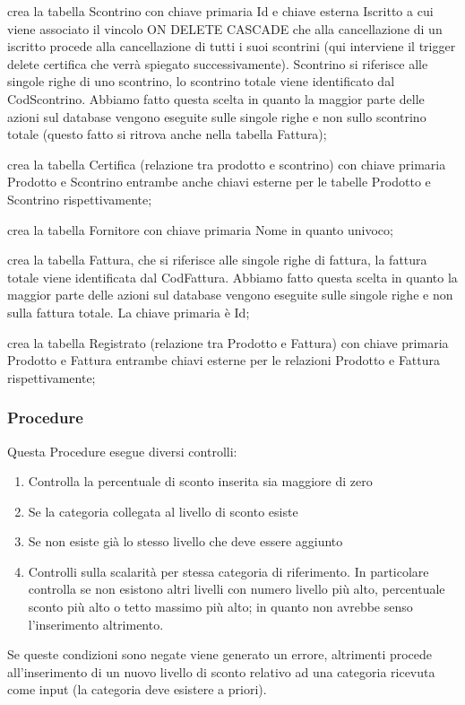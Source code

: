 
crea la tabella Scontrino con chiave primaria Id e chiave esterna Iscritto a cui viene associato il vincolo ON DELETE CASCADE che alla cancellazione di un iscritto procede alla cancellazione di tutti i suoi scontrini (qui interviene il trigger delete certifica che verr\`a spiegato successivamente). Scontrino si riferisce alle singole righe di uno scontrino, lo scontrino totale viene identificato dal CodScontrino. Abbiamo fatto questa scelta in quanto la maggior parte delle azioni sul database vengono eseguite sulle singole righe e non sullo scontrino totale (questo fatto si ritrova anche nella tabella Fattura);


crea la tabella Certifica (relazione tra prodotto e scontrino) con chiave primaria Prodotto e Scontrino entrambe anche chiavi esterne per le tabelle Prodotto e Scontrino rispettivamente;


crea la tabella Fornitore con chiave primaria Nome in quanto univoco;


crea la tabella Fattura, che si riferisce alle singole righe di fattura, la fattura totale viene identificata dal CodFattura. Abbiamo fatto questa scelta in quanto la maggior parte delle azioni sul database vengono eseguite sulle singole righe e non sulla fattura totale. La chiave primaria \`e Id;


crea la tabella Registrato (relazione tra Prodotto e Fattura) con chiave primaria Prodotto e Fattura entrambe chiavi esterne per le relazioni Prodotto e Fattura rispettivamente;


\subsubsection{Procedure}



Questa Procedure esegue diversi controlli:
\begin{enumerate}

\item Controlla la percentuale di sconto inserita sia maggiore di zero

\item Se la categoria collegata al livello di sconto esiste

\item Se non esiste gi\`a lo stesso livello che deve essere aggiunto

\item Controlli sulla scalarit\`a per stessa categoria di riferimento. In particolare controlla se non esistono altri livelli con numero livello pi\`u alto, percentuale sconto pi\`u alto o tetto massimo pi\`u alto; in quanto non avrebbe senso l'inserimento altrimento.
\end{enumerate}

Se queste condizioni sono negate viene generato un errore, altrimenti procede all'inserimento di un nuovo livello di sconto relativo ad una categoria ricevuta come input (la categoria deve esistere a priori).

